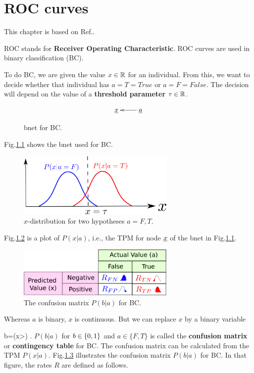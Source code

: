 \chapter{ROC curves}
This chapter is based on Ref.\cite{wiki-roc}.

ROC stands for
{\bf  Receiver Operating Characteristic}.
ROC curves are used in binary
classification (BC).

To do BC, we are given the value
$x\in{ \mathbb{R}}$
for an individual. From this, 
we want to decide
whether that
individual 
has $a=T=True$
or $a=F=False$.
The decision will
depend on the
value
of a
{\bf threshold parameter $\tau\in { \mathbb{R}}$}.


\begin{figure}[h!]
$$\xymatrix{
\rvx&\rva\ar[l]
}$$
\caption{bnet for 
BC.}
\label{fig-hyp-bnet}
\end{figure}
Fig.\ref{fig-hyp-bnet}
shows the bnet used for BC.


\begin{figure}[h!]
\centering
\includegraphics[width=3in]
{roc/bell-curves.png}
\caption{$x$-distribution for
two hypotheses $a=F,T$. } 
\label{fig-bell-curves}
\end{figure}
Fig.\ref{fig-bell-curves}
is a 
plot
of $P(x|a)$, i.e., the TPM 
for node ${\underline{x}}$
of the bnet in Fig.\ref{fig-hyp-bnet}.


\begin{figure}[h!]
\centering
\includegraphics[width=3in]
{roc/confusion-mat.png}
\caption{The confusion matrix 
$P(b|a)$
for BC.} 
\label{fig-confusion-mat}
\end{figure}

Whereas $a$
is binary, $x$
is continuous. 
But we can replace
$x$ by a binary variable

\beq
b=\indi(x>\tau)
\;.
\eeq
$P(b|a)$
for $b\in\{0,1\}$
and $a\in \{F,T\}$
is called the
{\bf confusion matrix}
or {\bf contingency table}
for BC.
The confusion
matrix can be
calculated from
the TPM $P(x|a)$.
Fig.\ref{fig-confusion-mat}
illustrates the
confusion matrix
$P(b|a)$
for BC.
In that
figure,
the rates $R$
are defined as
follows.

